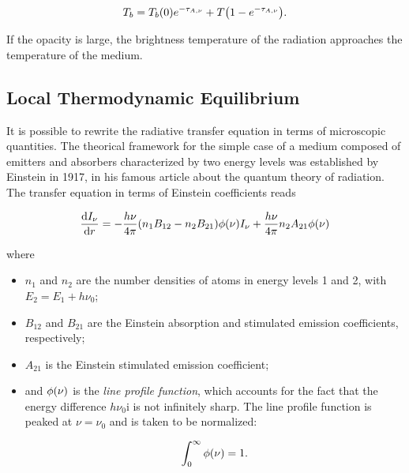 \begin{equation}
        T_b = T_b\qty(0) e^{-\tau_{A,\nu}} + T\qty(1 -
        e^{-\tau_{A,\nu}}).
        \label{eq:rte_solution_thermal}
\end{equation}

If the opacity is large, the brightness temperature of the radiation
approaches the temperature of the medium.

\subsection{Local Thermodynamic Equilibrium}

It is possible to rewrite the radiative transfer equation in terms of
microscopic quantities. The theorical framework for the simple case of a
medium composed of emitters and absorbers characterized by two energy
levels was established by Einstein in
1917, in his famous article about the quantum theory of radiation.
The transfer equation in terms of Einstein coefficients reads

\begin{equation}
        \dv{I_\nu}{r} = -\frac{h\nu}{4\pi}\qty(n_1 B_{12} -
        n_2 B_{21})\phi\qty(\nu)I_\nu +
        \frac{h\nu}{4\pi} n_2 A_{21}\phi\qty(\nu)
\end{equation}

where

\begin{itemize}
        \item $n_1$ and $n_2$ are the number densities of atoms in energy
        levels 1 and 2, with $E_2 = E_1 + h\nu_0$;
        \item $B_{12}$ and $B_{21}$ are the Einstein absorption and
        stimulated emission coefficients, respectively;
        \item $A_{21}$ is the Einstein stimulated emission coefficient;
        \item and $\phi\qty(\nu)$ is the \emph{line profile function},
        which accounts for the fact that the energy difference $h\nu_0$i
        is not infinitely sharp. The line profile function is peaked at
        $\nu = \nu_0$ and is taken to be normalized:

        \begin{equation}
                \int^\infty_0 \phi\qty(\nu) = 1.
        \end{equation}

\end{itemize}

